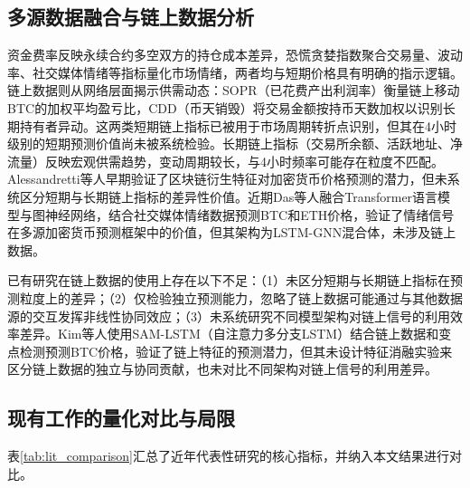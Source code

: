 \documentclass[12pt,a4paper]{ctexart}
\begin{document}
\subsection{多源数据融合与链上数据分析}资金费率反映永续合约多空双方的持仓成本差异\cite{malik2023}，恐慌贪婪指数聚合交易量、波动率、社交媒体情绪等指标量化市场情绪\cite{carosia2024}，两者均与短期价格具有明确的指示逻辑。链上数据则从网络层面揭示供需动态：SOPR（已花费产出利润率）衡量链上移动BTC的加权平均盈亏比，CDD（币天销毁）将交易金额按持币天数加权以识别长期持有者异动。这两类短期链上指标已被用于市场周期转折点识别，但其在4小时级别的短期预测价值尚未被系统检验。长期链上指标（交易所余额、活跃地址、净流量）反映宏观供需趋势，变动周期较长，与4小时频率可能存在粒度不匹配。Alessandretti等人\cite{alessandretti2018}早期验证了区块链衍生特征对加密货币价格预测的潜力，但未系统区分短期与长期链上指标的差异性价值。近期Das等人\cite{das2026}融合Transformer语言模型与图神经网络，结合社交媒体情绪数据预测BTC和ETH价格，验证了情绪信号在多源加密货币预测框架中的价值，但其架构为LSTM-GNN混合体，未涉及链上数据。

已有研究\cite{corbet2019}在链上数据的使用上存在以下不足：（1）未区分短期与长期链上指标在预测粒度上的差异；（2）仅检验独立预测能力，忽略了链上数据可能通过与其他数据源的交互发挥非线性协同效应；（3）未系统研究不同模型架构对链上信号的利用效率差异。Kim等人\cite{kim2022}使用SAM-LSTM（自注意力多分支LSTM）结合链上数据和变点检测预测BTC价格，验证了链上特征的预测潜力，但其未设计特征消融实验来区分链上数据的独立与协同贡献，也未对比不同架构对链上信号的利用差异。

\subsection{现有工作的量化对比与局限}

表\ref{tab:lit_comparison}汇总了近年代表性研究的核心指标，并纳入本文结果进行对比。
\end{document}
